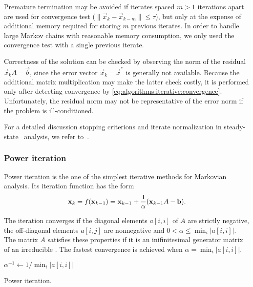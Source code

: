 Premature termination may be avoided if iterates spaced $m > 1$
iterations apart are used for convergence test
($\| \vec{x}_k - \vec{x}_{k - m} \| \le \tau$), but only at the
expense of additional memory required for storing $m$ previous
iterates. In order to handle large Markov chains with reasonable
memory consumption, we only used the convergence test with a single
previous iterate.

Correctness of the solution can be checked by observing the norm of
the residual $\vec{x}_{k} A - \vec{b}$, since the error vector
$\vec{x}_k - \vec{x}^*$ is generally not available. Because the
additional matrix multiplication may make the latter check costly, it
is performed only after detecting convergence by
\cref{eq:algorithms:iterative:convergence}. Unfortunately, the
residual norm may not be representative of the error norm if the
problem is ill-conditioned.

For a detailed discussion stopping criterions and iterate
normalization in steady-state \CTMC\ analysis, we refer
to~\citep[Section~10.3.5]{stewart2009probability}.

\subsubsection{Power iteration}

Power iteration is the one of the simplest iterative methods for
Markovian analysis. Its iteration function has the form
\begin{equation}
  \vec{x}_k = f(\vec{x}_{k - 1}) = \vec{x}_{k - 1} + \frac{1}{\alpha} \mleft(
  \vec{x}_{k - 1} A - \vec{b} \mright) \text.
\end{equation}

The iteration converges if the diagonal elements $a[i,i]$ of $A$ are
strictly negative, the off-diagonal elements $a[i,j]$ are nonnegative
and $0 < \alpha \le \min_{i} \lvert a[i,i] \rvert$. The matrix $A$
satisfies these properties if it is an inifinitesimal generator matrix
of an irreducible \CTMC. The fastest convergence is achieved when
$\alpha = \min_{i} \lvert a[i,i] \rvert$.

\begin{algorithm}
  $\alpha^{-1} \gets 1 / \min_{i} \lvert a[i,i] \rvert$\;
  \caption{Power iteration.}
  \label{alg:algorithms:iterative:power}
\end{algorithm}

